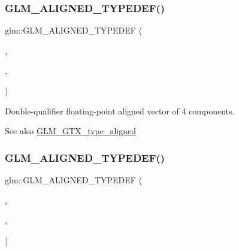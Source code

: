 \subsubsection{\texorpdfstring{G\+L\+M\+\_\+\+A\+L\+I\+G\+N\+E\+D\+\_\+\+T\+Y\+P\+E\+D\+E\+F()}{GLM\_ALIGNED\_TYPEDEF()}\hspace{0.1cm}{\footnotesize\ttfamily [162/209]}}
{\footnotesize\ttfamily glm\+::\+G\+L\+M\+\_\+\+A\+L\+I\+G\+N\+E\+D\+\_\+\+T\+Y\+P\+E\+D\+EF (\begin{DoxyParamCaption}\item[{\mbox{\hyperlink{group__gtc__type__precision_ga41fb27973aedd37b7284789f2f997420}{f64vec4}}}]{,  }\item[{aligned\+\_\+f64vec4}]{,  }\item[{32}]{ }\end{DoxyParamCaption})}

Double-\/qualifier floating-\/point aligned vector of 4 components. \begin{DoxySeeAlso}{See also}
\mbox{\hyperlink{group__gtx__type__aligned}{G\+L\+M\+\_\+\+G\+T\+X\+\_\+type\+\_\+aligned}} 
\end{DoxySeeAlso}
\mbox{\label{group__gtx__type__aligned_gafed7d010235a3aa7ea2f88646858f2ae}} 
\subsubsection{\texorpdfstring{G\+L\+M\+\_\+\+A\+L\+I\+G\+N\+E\+D\+\_\+\+T\+Y\+P\+E\+D\+E\+F()}{GLM\_ALIGNED\_TYPEDEF()}\hspace{0.1cm}{\footnotesize\ttfamily [163/209]}}
{\footnotesize\ttfamily glm\+::\+G\+L\+M\+\_\+\+A\+L\+I\+G\+N\+E\+D\+\_\+\+T\+Y\+P\+E\+D\+EF (\begin{DoxyParamCaption}\item[{\mbox{\hyperlink{group__core__types_ga8357ec0aab6f8cf69313592492663c3f}{mat2}}}]{,  }\item[{aligned\+\_\+mat2}]{,  }\item[{16}]{ }\end{DoxyParamCaption})}

